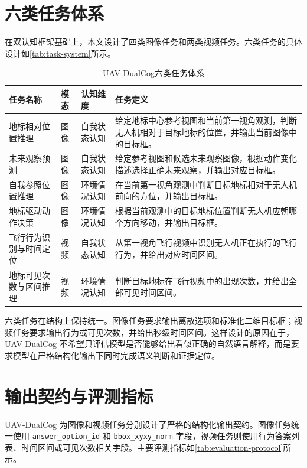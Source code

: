 \section{六类任务体系}

在双认知框架基础上，本文设计了四类图像任务和两类视频任务。六类任务的具体设计如\autoref{tab:task-system}所示。

\begin{table}[htbp]
    \centering
    \caption{UAV-DualCog六类任务体系}
    \label{tab:task-system}
    \begin{tabularx}{\textwidth}{p{3.0cm}p{1.6cm}p{2.0cm}X}
        \toprule
        任务名称 & 模态 & 认知维度 & 任务定义 \\
        \midrule
        地标相对位置推理 & 图像 & 自我状态认知 & 给定地标中心参考视图和当前第一视角观测，判断无人机相对于目标地标的位置，并输出当前图像中的目标框。 \\
        未来观察预测 & 图像 & 自我状态认知 & 给定参考视图和候选未来观察图像，根据动作变化描述选择正确未来观察，并输出对应目标框。 \\
        自我参照位置推理 & 图像 & 环境情况认知 & 在当前第一视角观测中判断目标地标相对于无人机前向的方位，并输出目标框。 \\
        地标驱动动作决策 & 图像 & 环境情况认知 & 根据当前观测中的目标地标位置判断无人机应朝哪个方向移动，并输出目标框。 \\
        飞行行为识别与时间定位 & 视频 & 自我状态认知 & 从第一视角飞行视频中识别无人机正在执行的飞行行为，并给出对应时间区间。 \\
        地标可见次数与区间推理 & 视频 & 环境情况认知 & 判断目标地标在飞行视频中的出现次数，并给出全部可见时间区间。 \\
        \bottomrule
    \end{tabularx}
\end{table}

六类任务在结构上保持统一。图像任务要求输出离散选项和标准化二维目标框；视频任务要求输出行为或可见次数，并给出秒级时间区间。这样设计的原因在于，UAV-DualCog 不希望只评估模型是否能够给出看似正确的自然语言解释，而是要求模型在严格结构化输出下同时完成语义判断和证据定位。

\section{输出契约与评测指标}

UAV-DualCog 为图像和视频任务分别设计了严格的结构化输出契约。图像任务统一使用 \texttt{answer\_option\_id} 和 \texttt{bbox\_xyxy\_norm} 字段，视频任务则使用行为答案列表、时间区间或可见次数相关字段。主要评测指标如\autoref{tab:evaluation-protocol}所示。

